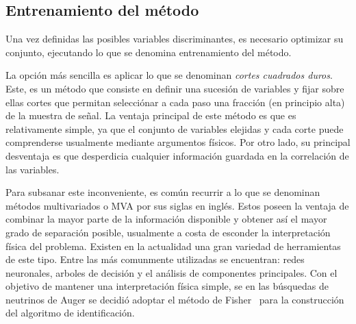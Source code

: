 	\subsection{Entrenamiento del método}
	
	Una vez definidas las posibles variables discriminantes, es necesario optimizar su conjunto, ejecutando lo que se denomina entrenamiento del método.
	
	La opción más sencilla es aplicar lo que se denominan \emph{cortes cuadrados duros}.
	Este, es un método que consiste en definir una sucesión de variables y fijar sobre ellas cortes que permitan selecciónar a cada paso una fracción (en principio alta) de la muestra de señal.
	La ventaja principal de este método es que es relativamente simple, ya que el conjunto de variables elejidas y cada corte puede comprenderse usualmente mediante argumentos físicos.
	Por otro lado, su principal desventaja es que desperdicia cualquier información guardada en la correlación de las variables.
	
	Para subsanar este inconveniente, es común recurrir a lo que se denominan métodos multivariados o MVA por sus siglas en inglés.
	Estos poseen la ventaja de combinar la mayor parte de la información disponible y obtener así el mayor grado de separación posible, usualmente a costa de esconder la interpretación física del problema.
	Existen en la actualidad una gran variedad de herramientas de este tipo. Entre las más comunmente utilizadas se encuentran: redes neuronales, arboles de decisión y el análisis de componentes principales. 
	Con el objetivo de mantener una interpretación física simple, se en las búsquedas de neutrinos de Auger se decidió adoptar el método de Fisher~\cite{cite:Fisher} para la construcción del algoritmo de identificación.

